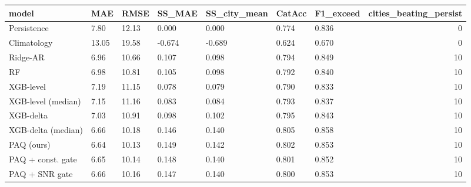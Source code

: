 \begin{tabular}{lllllllr}
\toprule
model & MAE & RMSE & SS\_MAE & SS\_city\_mean & CatAcc & F1\_exceed & cities\_beating\_persist \\
\midrule
Persistence & 7.80 & 12.13 & 0.000 & 0.000 & 0.774 & 0.836 & 0 \\
Climatology & 13.05 & 19.58 & -0.674 & -0.689 & 0.624 & 0.670 & 0 \\
Ridge-AR & 6.96 & 10.66 & 0.107 & 0.098 & 0.794 & 0.849 & 10 \\
RF & 6.98 & 10.81 & 0.105 & 0.098 & 0.792 & 0.840 & 10 \\
XGB-level & 7.19 & 11.15 & 0.078 & 0.079 & 0.790 & 0.833 & 10 \\
XGB-level (median) & 7.15 & 11.16 & 0.083 & 0.084 & 0.793 & 0.837 & 10 \\
XGB-delta & 7.03 & 10.91 & 0.098 & 0.102 & 0.795 & 0.843 & 10 \\
XGB-delta (median) & 6.66 & 10.18 & 0.146 & 0.140 & 0.805 & 0.858 & 10 \\
PAQ (ours) & 6.64 & 10.13 & 0.149 & 0.142 & 0.802 & 0.853 & 10 \\
PAQ + const. gate & 6.65 & 10.14 & 0.148 & 0.140 & 0.801 & 0.852 & 10 \\
PAQ + SNR gate & 6.66 & 10.16 & 0.147 & 0.140 & 0.800 & 0.853 & 10 \\
\bottomrule
\end{tabular}

